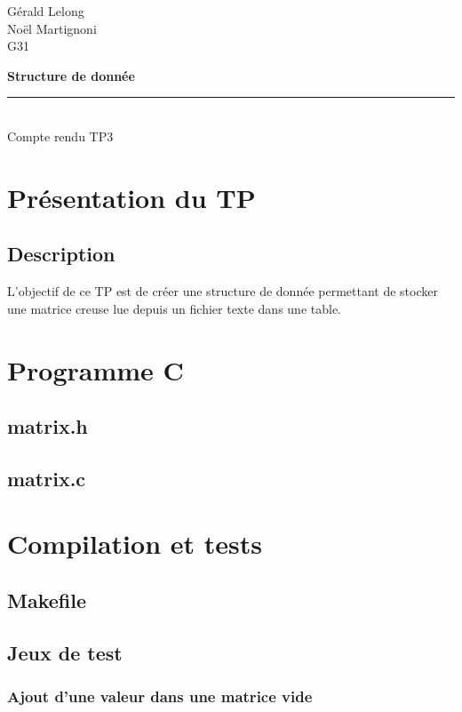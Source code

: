 \documentclass[12pt]{report}
\def\maketitle{
\thispagestyle{empty}

\noindent 
  Gérald Lelong \\
  Noël Martignoni \\
  G31 \\
 
  \vskip 6cm
  
  \begin{center}\leavevmode
  \Large  \textbf{Structure de donnée} \\
  \rule{9cm}{1pt} \\
  \Huge Compte rendu TP3 \\
  \end{center}
      
  \cleardoublepage
  }
\begin{document}
\maketitle

\tableofcontents

\chapter{Présentation du TP}

\section{Description}

L'objectif de ce TP est de créer une structure de donnée permettant de stocker une matrice creuse lue depuis un fichier texte dans une table.

\chapter{Programme C}

\section{matrix.h}



\section{matrix.c}



\chapter{Compilation et tests}

\section{Makefile}



\section{Jeux de test}

\subsection{Ajout d'une valeur dans une matrice vide}
\end{document}

